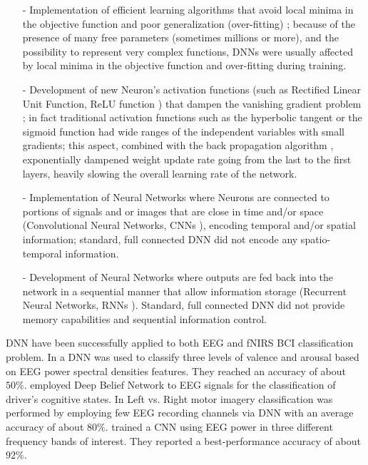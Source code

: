 \documentclass[12pt]{iopart}
\begin{document}
\begin{itemize}
	\item[-] Implementation of efficient learning algorithms that avoid local minima in the objective function and poor generalization (over-fitting) \parencite{kingma2014adam}; because of the presence of many free parameters (sometimes millions or more), and the possibility to represent very complex functions, DNNs were usually affected by local minima in the objective function and over-fitting  during training. 
	\item[-] Development of new Neuron's activation functions (such as Rectified Linear Unit Function, ReLU function \parencite{dahl2013improving, maas2013rectifier}) that dampen  the vanishing gradient problem \parencite{pascanu2013difficulty}; in fact traditional activation functions such as the hyperbolic tangent or the sigmoid function had wide ranges of the independent variables with small gradients;  this aspect, combined with the back propagation algorithm \parencite{hecht1988theory}, exponentially dampened weight update rate going from the last to the first layers, heavily slowing the overall learning rate of the network.
	\item[-] Implementation of  Neural Networks where Neurons are connected to portions of signals and or images that are close in time and/or space (Convolutional Neural Networks, CNNs \parencite{krizhevsky2012imagenet, kalchbrenner2014convolutional}), encoding temporal and/or spatial information; standard, full connected DNN  did not encode any spatio-temporal information.
	\item[-] Development of  Neural Networks where outputs are fed back into the network in a sequential manner that allow information storage (Recurrent Neural Networks, RNNs \parencite{mikolov2010recurrent, hochreiter1997long}). Standard, full connected DNN  did not provide memory capabilities and sequential information control.
\end{itemize}

DNN have been successfully applied to  both EEG and fNIRS BCI classification problem. In \textcite{jirayucharoensak2014eeg} a DNN was used to classify three levels of valence and arousal based on EEG power spectral densities  features. They reached an accuracy of about $50\%$. 
\textcite{hajinoroozi2015feature} employed Deep Belief Network to EEG signals for the classification of driver's cognitive states. 
In \textcite{an2014deep} Left vs. Right motor imagery classification  was performed by employing few EEG recording channels via DNN with an average accuracy of about $80\%$. 
 \textcite{bashivan2015learning} trained a CNN using EEG power in three different frequency bands of interest. They reported a best-performance accuracy of about $92\%$.
\end{document}
